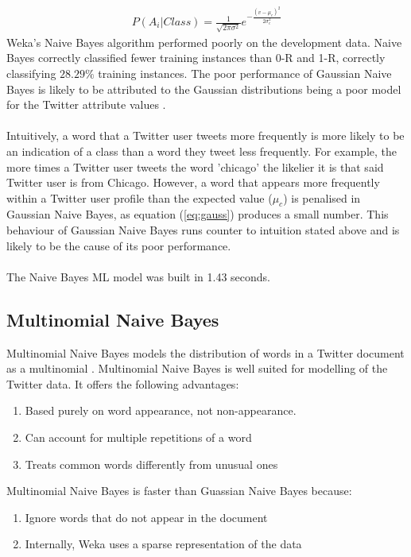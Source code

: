 \documentclass[11pt]{article}
\begin{document}
\begin{gather*}
P(A_i|Class) = \frac{1}{\sqrt{2\pi\sigma^{2}}}e^{-\frac{(v-\mu_c)^{2}}{2\sigma_c^{2}}}
\tag{3}\label{eq:gauss}
\end{gather*}
Weka's Naive Bayes algorithm performed poorly on the development data. Naive Bayes correctly classified fewer training instances than 0-R and 1-R, correctly classifying $28.29\%$ training instances. The poor performance of Gaussian Naive Bayes is likely to be attributed to the Gaussian distributions being a poor model for the Twitter attribute values \cite{john-naive}.\\\\
Intuitively, a word that a Twitter user tweets more frequently is more likely to be an indication of a class than a word they tweet less frequently. For example, the more times a Twitter user tweets the word 'chicago' the likelier it is that said Twitter user is from Chicago. However, a word that appears more frequently within a Twitter user profile than the expected value ($\mu_c$) is penalised in Gaussian Naive Bayes, as equation (\ref{eq:gauss}) produces a small number. This behaviour of Gaussian Naive Bayes runs counter to intuition stated above and is likely to be the cause of its poor performance.\\\\
The Naive Bayes ML model was built in 1.43 seconds. 

\subsection{Multinomial Naive Bayes}  

Multinomial Naive Bayes models the distribution of words in a Twitter document as a multinomial \cite{ren-multi}. Multinomial Naive Bayes is well suited for modelling of the Twitter data. It offers the  following advantages:

\begin{enumerate}
\item Based purely on word appearance, not non-appearance.
\item Can account for multiple repetitions of a word
\item Treats common words differently from unusual ones
\end{enumerate} 
Multinomial Naive Bayes is faster than Guassian Naive Bayes because:

\begin{enumerate}
\item Ignore words that do not appear in the document
\item Internally, Weka uses a sparse representation of the data
\end{enumerate} 
\end{document}

